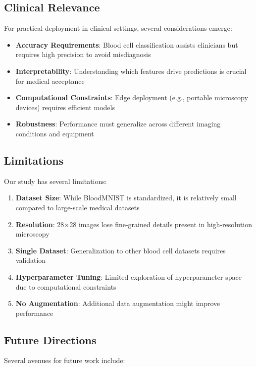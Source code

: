 \documentclass[runningheads]{llncs}
\begin{document}
\subsection{Clinical Relevance}

For practical deployment in clinical settings, several considerations emerge:

\begin{itemize}
    \item \textbf{Accuracy Requirements}: Blood cell classification assists clinicians but requires high precision to avoid misdiagnosis
    \item \textbf{Interpretability}: Understanding which features drive predictions is crucial for medical acceptance
    \item \textbf{Computational Constraints}: Edge deployment (e.g., portable microscopy devices) requires efficient models
    \item \textbf{Robustness}: Performance must generalize across different imaging conditions and equipment
\end{itemize}

\subsection{Limitations}

Our study has several limitations:

\begin{enumerate}
    \item \textbf{Dataset Size}: While BloodMNIST is standardized, it is relatively small compared to large-scale medical datasets
    \item \textbf{Resolution}: 28$\times$28 images lose fine-grained details present in high-resolution microscopy
    \item \textbf{Single Dataset}: Generalization to other blood cell datasets requires validation
    \item \textbf{Hyperparameter Tuning}: Limited exploration of hyperparameter space due to computational constraints
    \item \textbf{No Augmentation}: Additional data augmentation might improve performance
\end{enumerate}

\subsection{Future Directions}

Several avenues for future work include:
\end{document}
